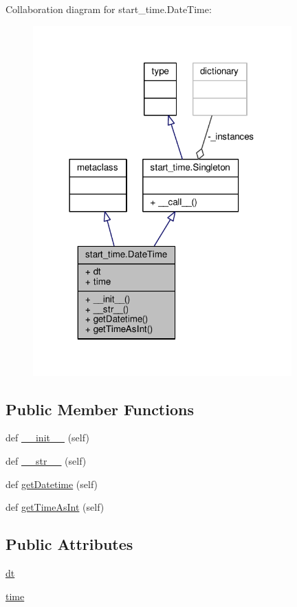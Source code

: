 Collaboration diagram for start\+\_\+time.\+Date\+Time\+:
\nopagebreak
\begin{figure}[H]
\begin{center}
\leavevmode
\includegraphics[width=282pt]{classstart__time_1_1_date_time__coll__graph}
\end{center}
\end{figure}
\subsection*{Public Member Functions}
\begin{DoxyCompactItemize}
\item 
def \hyperlink{classstart__time_1_1_date_time_ac489a04fcc4ecce6b76bf69acc878cb6}{\+\_\+\+\_\+init\+\_\+\+\_\+} (self)
\item 
def \hyperlink{classstart__time_1_1_date_time_add3ddbc0a0bcd171e4a81b8d806d5801}{\+\_\+\+\_\+str\+\_\+\+\_\+} (self)
\item 
def \hyperlink{classstart__time_1_1_date_time_af7ca3b38639f6c06b75264ebf6e8884e}{get\+Datetime} (self)
\item 
def \hyperlink{classstart__time_1_1_date_time_a06ea03ca31a47c26c12dbaaefb6a9c6d}{get\+Time\+As\+Int} (self)
\end{DoxyCompactItemize}
\subsection*{Public Attributes}
\begin{DoxyCompactItemize}
\item 
\hyperlink{classstart__time_1_1_date_time_af228dfce33d0bfbb39fb4fc5dabc0d48}{dt}
\item 
\hyperlink{classstart__time_1_1_date_time_a0dae698e4497fabd9c0ff5066629e0ad}{time}
\end{DoxyCompactItemize}



